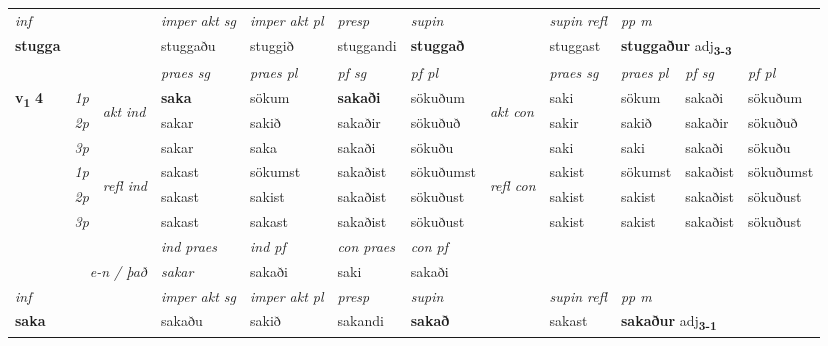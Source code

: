 \begin{longtable}[l]{X>{\footnotesize\itshape}llXXXXlXXXX}
\cmidrule{4-7}
   {\textit{inf}} & &  & \textit{imper akt sg} & \textit{imper akt pl}   & \textit{presp} & \textit{supin} && \textit{supin refl} & \textit{pp m} \\*
  {\textbf{stugga}} & && stuggaðu  & stuggið   & stuggandi &  \textbf{stuggað} && stuggast & \multicolumn{2}{l}{\textbf{stuggaður} adj\textbf{\textsubscript{3-3}}} \\*

\midrule

 & &   & \textit{praes sg}  & \textit{praes pl}    & \textit{ pf sg} & \textit{pf pl} & & \textit{praes sg}  & \textit{praes pl}    & \textit{pf sg} & \textit{pf pl }  \\ \cmidrule{4-7} \cmidrule{9-12}
 \multirow{2}{*}{{{\textbf{v{\textsubscript{1}}} \Large{\textbf{4}}}}}  & 1p & \multirow{3}{*}{\begin{turn}{90}\textit{akt ind}\end{turn}} & \textbf{saka} & sökum & \textbf{sakaði} & sökuðum & \multirow{3}{*}{\begin{turn}{90}\textit{akt con}\end{turn}} &saki & sökum & sakaði & sökuðum\\*
 & 2p &  &  sakar  & sakið & sakaðir & sökuðuð & & sakir & sakið & sakaðir & sökuðuð \\*
 & 3p &  & sakar & saka & sakaði & sökuðu & & saki & saki& sakaði & sökuðu \\*
\cmidrule{4-7} \cmidrule{9-12}
 & 1p & \multirow{3}{*}{\begin{turn}{90}\textit{refl ind}\end{turn}}  & sakast & sökumst & sakaðist & sökuðumst & \multirow{3}{*}{\begin{turn}{90}\textit{refl con}\end{turn}}  &sakist & sökumst & sakaðist & sökuðumst \\*
 & 2p &  & sakast & sakist & sakaðist & sökuðust & &sakist & sakist & sakaðist & sökuðust \\*
 & 3p  & & sakast & sakast & sakaðist & sökuðust & & sakist & sakist& sakaðist & sökuðust \\*
\cmidrule{4-7} \cmidrule{9-12}

   && &  \textit{ind praes} & \textit{ind pf} & \textit{con praes} & \textit{con pf} \\*
\multicolumn{3}{r}{\textit{e-n / það}} & sakar & sakaði & saki & sakaði \\*

\cmidrule{4-7}
   {\textit{inf}} & &  & \textit{imper akt sg} & \textit{imper akt pl}   & \textit{presp} & \textit{supin} && \textit{supin refl} & \textit{pp m} \\*
  {\textbf{saka}} & && sakaðu  & sakið   & sakandi &  \textbf{sakað} && sakast & \multicolumn{2}{l}{\textbf{sakaður} adj\textbf{\textsubscript{3-1}}} \\*


\end{longtable}
